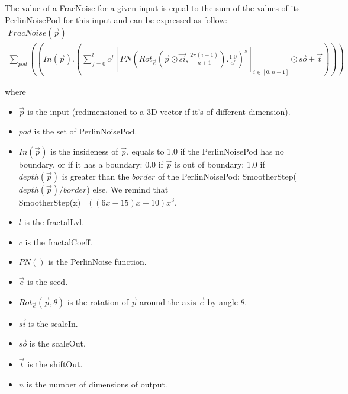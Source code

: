 The value of a FracNoise for a given input is equal to the sum of the values of its PerlinNoisePod for this input and can be expressed as follow:\\

\begin{equation}
\begin{array}{l}
FracNoise(\overrightarrow{p})=\\
\sum_{pod}\left(
  \left(
    In(\overrightarrow{p}).
    \left(
      \sum_{f=0}^lc^f
      \left[
        PN\left(
          Rot_{\overrightarrow{e}}\left(
            \overrightarrow{p}\odot\overrightarrow{si},\frac{2\pi(i+1)}{n+1}          
          \right).\frac{1.0}{c^f}
        \right)^s
      \right]_{i\in[0,n-1]}
      \odot \overrightarrow{so}+\overrightarrow{t}
    \right)
  \right)
\right)
\end{array}
\end{equation}

where\\
\begin{itemize}
\item $\overrightarrow{p}$ is the input (redimensioned to a 3D vector if it's of different dimension).
\item $pod$ is the set of PerlinNoisePod.
\item $In(\overrightarrow{p})$ is the insideness of $\overrightarrow{p}$, equals to 1.0 if the PerlinNoisePod has no boundary, or if it has a boundary: 0.0 if $\overrightarrow{p}$ is out of boundary; 1.0 if $depth(\overrightarrow{p})$ is greater than the $border$ of the PerlinNoisePod; SmootherStep($depth(\overrightarrow{p})/border$) else. We remind that\\ SmootherStep(x)=$((6x-15)x+10)x^3$.
\item $l$ is the fractalLvl.
\item $c$ is the fractalCoeff.
\item $PN()$ is the PerlinNoise function.
\item $\overrightarrow{e}$ is the seed.
\item $Rot_{\overrightarrow{e}}(\overrightarrow{p}, \theta)$ is the rotation of $\overrightarrow{p}$ around the axis $\overrightarrow{e}$ by angle $\theta$.
\item $\overrightarrow{si}$ is the scaleIn.
\item $\overrightarrow{so}$ is the scaleOut.
\item $\overrightarrow{t}$ is the shiftOut.
\item $n$ is the number of dimensions of output.
\end{itemize}

